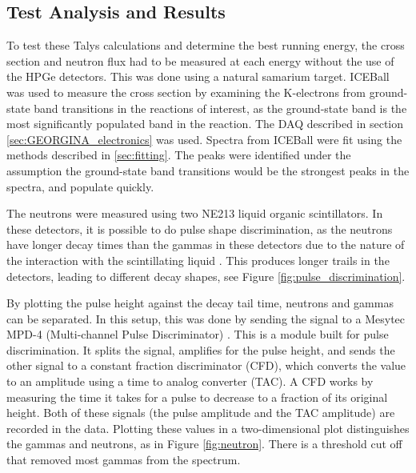 

\subsection{Test Analysis and Results}

To test these Talys calculations and determine the best running energy, the cross section and neutron flux had to be measured at each energy without the use of the HPGe detectors. This was done using a natural samarium target. ICEBall was used to measure the cross section by examining the K-electrons from ground-state band transitions in the reactions of interest, as the ground-state band is the most significantly populated band in the reaction. The DAQ described in section \ref{sec:GEORGINA_electronics} was used. Spectra from ICEBall were fit using the methods described in \ref{sec:fitting}. The peaks were identified under the assumption the ground-state band transitions would be the strongest peaks in the spectra, and populate quickly. 

The neutrons were measured using two NE213 liquid organic scintillators. In these detectors, it is possible to do pulse shape discrimination, as the neutrons have longer decay times than the gammas in these detectors due to the nature of the interaction with the scintillating liquid \citep{knoll00:rad_det_meas}. This produces longer trails in the detectors, leading to different decay shapes, see Figure \ref{fig:pulse_discrimination}. 



By plotting the pulse height against the decay tail time, neutrons and gammas can be separated. In this setup, this was done by sending the signal to a Mesytec MPD-4 (Multi-channel Pulse Discriminator) \citep{mesytec:_PSD}. This is a module built for pulse discrimination. It splits the signal, amplifies for the pulse height, and sends the other signal to a constant fraction discriminator (CFD), which converts the value to an amplitude using a time to analog converter (TAC). A CFD works by measuring the time it takes for a pulse to decrease to a fraction of its original height. Both of these signals (the pulse amplitude and the TAC amplitude) are recorded in the data. Plotting these values in a two-dimensional plot distinguishes the gammas and neutrons, as in Figure \ref{fig:neutron}. There is a threshold cut off that removed most gammas from the spectrum.



